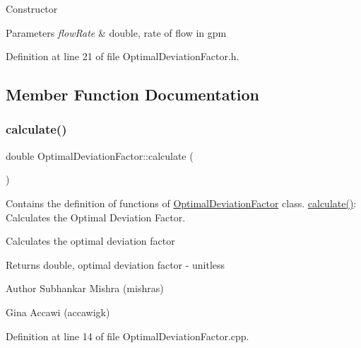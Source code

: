 Constructor 
\begin{DoxyParams}{Parameters}
{\em flow\+Rate} & double, rate of flow in gpm \\
\hline
\end{DoxyParams}


Definition at line 21 of file Optimal\+Deviation\+Factor.\+h.



\subsection{Member Function Documentation}
\mbox{\label{class_optimal_deviation_factor_aaa6687bb46d275c4cbcfe44caf895a37}} 
\subsubsection{\texorpdfstring{calculate()}{calculate()}\hspace{0.1cm}{\footnotesize\ttfamily [1/3]}}
{\footnotesize\ttfamily double Optimal\+Deviation\+Factor\+::calculate (\begin{DoxyParamCaption}{ }\end{DoxyParamCaption})}



Contains the definition of functions of \hyperlink{class_optimal_deviation_factor}{Optimal\+Deviation\+Factor} class. \hyperlink{class_optimal_deviation_factor_aaa6687bb46d275c4cbcfe44caf895a37}{calculate()}\+: Calculates the Optimal Deviation Factor. 

Calculates the optimal deviation factor \begin{DoxyReturn}{Returns}
double, optimal deviation factor -\/ unitless
\end{DoxyReturn}
\begin{DoxyAuthor}{Author}
Subhankar Mishra (mishras) 

Gina Accawi (accawigk) 
\end{DoxyAuthor}


Definition at line 14 of file Optimal\+Deviation\+Factor.\+cpp.

\mbox{\label{class_optimal_deviation_factor_aaa6687bb46d275c4cbcfe44caf895a37}} 
